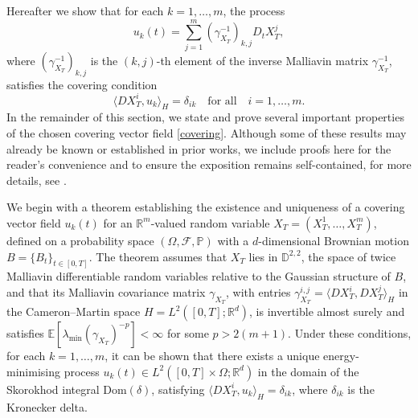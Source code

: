 \documentclass[]{interact}
\newcommand{\1}{\mathbf{1}}
\theoremstyle{plain}%
\theoremstyle{definition}
\theoremstyle{remark}
\numberwithin{equation}{section}
\begin{document}
%
Hereafter we show that for each \(k = 1, \ldots, m\), the process
\begin{equation}
u_k(t) = \sum_{j=1}^m \left( \gamma_{X_T}^{-1} \right)_{k,j} D_t X_T^j,
\label{covering}
\end{equation}
where \(\left( \gamma_{X_T}^{-1} \right)_{k,j}\) is the \((k, j)\)-th element of the inverse Malliavin matrix \(\gamma_{X_T}^{-1}\), satisfies the covering condition
\begin{equation*}
\langle D X_T^i, u_k \rangle_H = \delta_{ik} \quad \text{for all} \quad i = 1, \ldots, m.
\end{equation*}
%
\noindent
In the remainder of this section, we state and prove several important properties of the chosen covering vector field \eqref{covering}. Although some of these results may already be known or established in prior works, we include proofs here for the reader’s convenience and to ensure the exposition remains self-contained, for more details, see \cite{kunita1997stochastic, nualart2006malliavin}.

We begin with a theorem establishing the existence and uniqueness of a covering vector field \( u_k(t) \) for an \( \mathbb{R}^m \)-valued random variable \( X_T = (X_T^1, \ldots, X_T^m) \), defined on a probability space \( (\Omega, \mathcal{F}, \mathbb{P}) \) with a \( d \)-dimensional Brownian motion \( B=\{B_t\}_{t \in [0, T]} \). The theorem assumes that \( X_T \) lies in \( \mathbb{D}^{2,2} \), the space of twice Malliavin differentiable random variables relative to the Gaussian structure of \( B \), and that its Malliavin covariance matrix \( \gamma_{X_T} \), with entries \( \gamma_{X_T}^{i,j} = \langle D X_T^i, D X_T^j \rangle_H \) in the Cameron–Martin space \( H = L^2([0, T]; \mathbb{R}^d) \), is invertible almost surely and satisfies \( \mathbb{E}[\lambda_{\min}(\gamma_{X_T})^{-p}] < \infty \) for some \( p > 2(m+1) \). Under these conditions, for each \( k = 1, \ldots, m \), it can be shown that there exists a unique energy-minimising process \( u_k(t) \in L^2([0, T] \times \Omega; \mathbb{R}^d) \) in the domain of the Skorokhod integral \( \mathrm{Dom}(\delta) \), satisfying \( \langle D X_T^i, u_k \rangle_H = \delta_{ik} \), where \( \delta_{ik} \) is the Kronecker delta.
\end{document}
